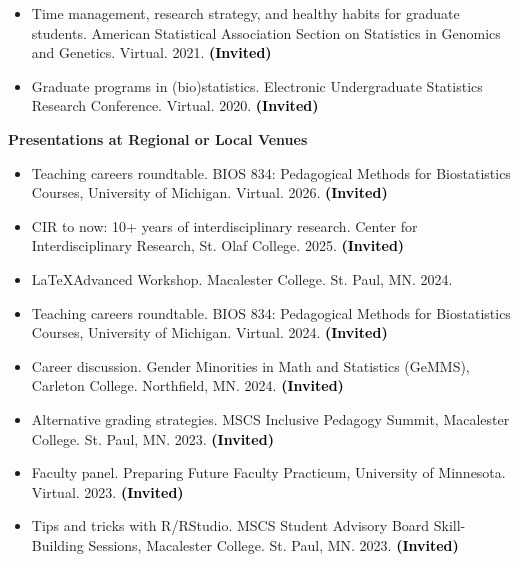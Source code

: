 \documentclass[margin]{res}
\newcommand{\annotate}[1]{\textcolor{black}{\textbf{(#1)}}}
\begin{document}
\begin{resume}
\begin{itemize}
\item[2.] Time management, research strategy, and healthy habits for graduate students. 
American Statistical Association Section on Statistics in Genomics and Genetics. Virtual. 2021. 
\annotate{Invited}

\item[1.] Graduate programs in (bio)statistics. 
Electronic Undergraduate Statistics Research Conference. Virtual. 2020. 
\annotate{Invited}

\end{itemize}


\textbf{Presentations at Regional or Local Venues}

\begin{itemize}

\item[24.] Teaching careers roundtable. 
BIOS 834: Pedagogical Methods for Biostatistics Courses, University of Michigan.  Virtual.  2026. 
\annotate{Invited}

\item[23.] CIR to now: 10+ years of interdisciplinary research. 
Center for Interdisciplinary Research, St. Olaf College. 2025.
\annotate{Invited}

\item[22.] %
\LaTeX Advanced Workshop. 
Macalester College. St. Paul, MN. 2024. %

\item[21.] Teaching careers roundtable. 
BIOS 834: Pedagogical Methods for Biostatistics Courses, University of Michigan.  Virtual.  2024. 
\annotate{Invited}

\item[20.] Career discussion.
Gender Minorities in Math and Statistics (GeMMS), Carleton College. Northfield, MN. 2024. 
\annotate{Invited}

\item[19.] Alternative grading strategies. 
MSCS Inclusive Pedagogy Summit, Macalester College. St. Paul, MN. 2023.  
\annotate{Invited}

\item[18.] Faculty panel.  
Preparing Future Faculty Practicum, University of Minnesota. Virtual. 2023. 
\annotate{Invited}

\item[17.] Tips and tricks with R/RStudio.  
MSCS Student Advisory Board Skill-Building Sessions, Macalester College. St. Paul, MN. 2023. 
\annotate{Invited}


\end{itemize}
\end{resume}
\end{document}
